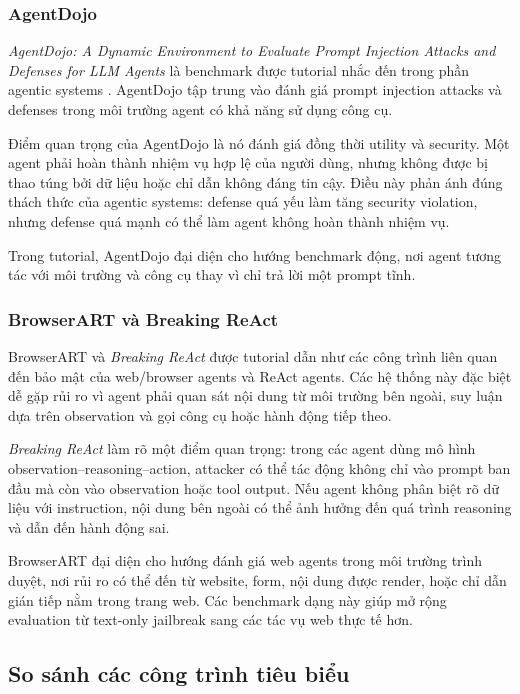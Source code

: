 \subsubsection{AgentDojo}

\textit{AgentDojo: A Dynamic Environment to Evaluate Prompt Injection
Attacks and Defenses for LLM Agents} là benchmark được tutorial nhắc đến
trong phần agentic systems \cite{debenedetti2024agentdojo}. AgentDojo tập
trung vào đánh giá prompt injection attacks và defenses trong môi trường
agent có khả năng sử dụng công cụ.

Điểm quan trọng của AgentDojo là nó đánh giá đồng thời utility và security.
Một agent phải hoàn thành nhiệm vụ hợp lệ của người dùng, nhưng không được
bị thao túng bởi dữ liệu hoặc chỉ dẫn không đáng tin cậy. Điều này phản
ánh đúng thách thức của agentic systems: defense quá yếu làm tăng security
violation, nhưng defense quá mạnh có thể làm agent không hoàn thành nhiệm
vụ.

Trong tutorial, AgentDojo đại diện cho hướng benchmark động, nơi agent
tương tác với môi trường và công cụ thay vì chỉ trả lời một prompt tĩnh.

\subsubsection{BrowserART và Breaking ReAct}

BrowserART và \textit{Breaking ReAct} được tutorial dẫn như các công trình
liên quan đến bảo mật của web/browser agents và ReAct agents. Các hệ thống
này đặc biệt dễ gặp rủi ro vì agent phải quan sát nội dung từ môi trường
bên ngoài, suy luận dựa trên observation và gọi công cụ hoặc hành động tiếp
theo.

\textit{Breaking ReAct} làm rõ một điểm quan trọng: trong các agent dùng mô
hình observation--reasoning--action, attacker có thể tác động không chỉ vào
prompt ban đầu mà còn vào observation hoặc tool output. Nếu agent không
phân biệt rõ dữ liệu với instruction, nội dung bên ngoài có thể ảnh hưởng
đến quá trình reasoning và dẫn đến hành động sai.

BrowserART đại diện cho hướng đánh giá web agents trong môi trường trình
duyệt, nơi rủi ro có thể đến từ website, form, nội dung được render, hoặc
chỉ dẫn gián tiếp nằm trong trang web. Các benchmark dạng này giúp mở rộng
evaluation từ text-only jailbreak sang các tác vụ web thực tế hơn.

\subsection{So sánh các công trình tiêu biểu}
\label{subsec:tutorial-paper-comparison}

